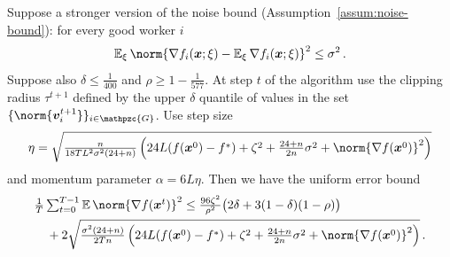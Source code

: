 \documentclass{article}
\newcommand{\gset}{\ensuremath{{\mathpzc{G}}}}
\begin{document}
\begin{corollary}\label{app:cor:convergence-byz-uniform}
  Suppose a stronger version of the noise bound (Assumption~\ref{assum:noise-bound}): for every good worker $i$
\[
  \E_\xi \norm{\nabla f_i(\xx; \xi) - \E_\xi \nabla f_i(\xx; \xi)}^2 \leq \sigma^2 \, .
\]
  Suppose also $\delta \le \tfrac{1}{400}$ and $\rho \ge 1 - \tfrac{1}{577}$. At step $t$ of the algorithm use the clipping radius $\tau^{t+1}$ defined by the upper $\delta$ quantile of values in the set $\{\norm{\vv_i^{t+1}}\}_{i\in\gset}$. 
  Use step size
  \[
    \eta 
    =
    \sqrt{
      \tfrac{n}{18 T L^2 \sigma^2 (24+n)}
      \left(
        24L(f(\xx^0) - f^\ast)
        +
        \zeta^2
        +
        \tfrac{24+n}{2n} \sigma^2 
        +
        \norm{\nabla f(\xx^0) }^2
      \right)
    }
  \] 
  and momentum parameter $\alpha = 6 L \eta$. 
  Then we have the uniform error bound 
  \begin{align*}
    & \tfrac{1}{T} \tsum_{t=0}^{T-1} \E \norm{\nabla f(\xx^t)}^2 
    \le  
    \tfrac{96 \zeta^2}{\rho^2} 
    \bigl(
      2 \delta + 3(1-\delta)(1-\rho)
    \bigr)
    \\
    &\quad 
    + 2 \sqrt{
    \tfrac{\sigma^2 (24+n)}{2 T n}
    \left(
      24L(f(\xx^0) - f^\ast)
      +
      \zeta^2
      +
      \tfrac{24+n}{2n} \sigma^2 
      +
      \norm{\nabla f(\xx^0) }^2
    \right)
    }
    \, .
  \end{align*}
\end{corollary}
\end{document}
